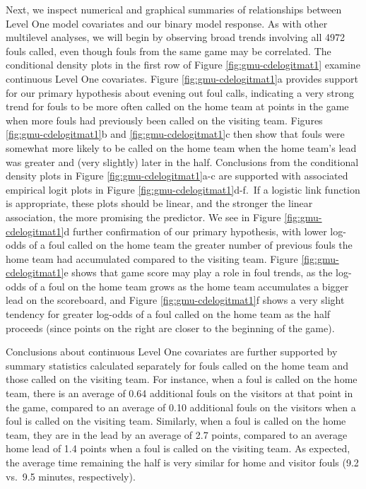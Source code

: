 \documentclass[
]{krantz}
\begin{document}
Next, we inspect numerical and graphical summaries of relationships between Level One model covariates and our binary model response. As with other multilevel analyses, we will begin by observing broad trends involving all 4972 fouls called, even though fouls from the same game may be correlated. The conditional density plots in the first row of Figure \ref{fig:gmu-cdelogitmat1} examine continuous Level One covariates. Figure \ref{fig:gmu-cdelogitmat1}a provides support for our primary hypothesis about evening out foul calls, indicating a very strong trend for fouls to be more often called on the home team at points in the game when more fouls had previously been called on the visiting team. Figures \ref{fig:gmu-cdelogitmat1}b and \ref{fig:gmu-cdelogitmat1}c then show that fouls were somewhat more likely to be called on the home team when the home team's lead was greater and (very slightly) later in the half. Conclusions from the conditional density plots in Figure \ref{fig:gmu-cdelogitmat1}a-c are supported with associated empirical logit plots in Figure \ref{fig:gmu-cdelogitmat1}d-f.~If a logistic link function is appropriate, these plots should be linear, and the stronger the linear association, the more promising the predictor. We see in Figure \ref{fig:gmu-cdelogitmat1}d further confirmation of our primary hypothesis, with lower log-odds of a foul called on the home team the greater number of previous fouls the home team had accumulated compared to the visiting team. Figure \ref{fig:gmu-cdelogitmat1}e shows that game score may play a role in foul trends, as the log-odds of a foul on the home team grows as the home team accumulates a bigger lead on the scoreboard, and Figure \ref{fig:gmu-cdelogitmat1}f shows a very slight tendency for greater log-odds of a foul called on the home team as the half proceeds (since points on the right are closer to the beginning of the game).

Conclusions about continuous Level One covariates are further supported by summary statistics calculated separately for fouls called on the home team and those called on the visiting team. For instance, when a foul is called on the home team, there is an average of 0.64 additional fouls on the visitors at that point in the game, compared to an average of 0.10 additional fouls on the visitors when a foul is called on the visiting team. Similarly, when a foul is called on the home team, they are in the lead by an average of 2.7 points, compared to an average home lead of 1.4 points when a foul is called on the visiting team. As expected, the average time remaining the half is very similar for home and visitor fouls (9.2 vs.~9.5 minutes, respectively).
\end{document}
